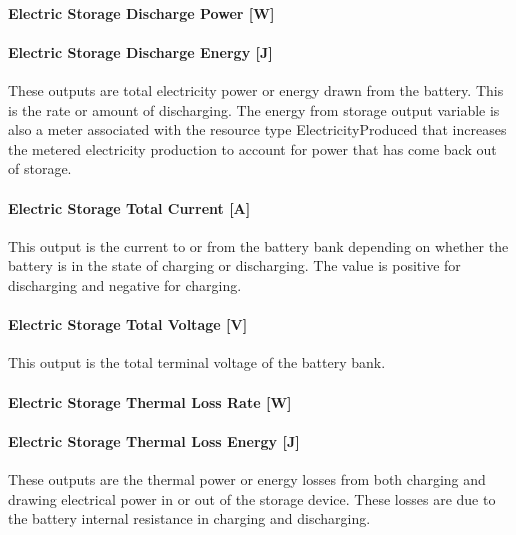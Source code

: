 \paragraph{Electric Storage Discharge Power {[}W{]}}\label{electric-storage-discharge-power-w-1}

\paragraph{Electric Storage Discharge Energy {[}J{]}}\label{electric-storage-discharge-energy-j-1}

These outputs are total electricity power or energy drawn from the battery. This is the rate or amount of discharging. The energy from storage output variable is also a meter associated with the resource type ElectricityProduced that increases the metered electricity production to account for power that has come back out of storage.

\paragraph{Electric Storage Total Current {[}A{]}}\label{electric-storage-total-current-a}

This output is the current to or from the battery bank depending on whether the battery is in the state of charging or discharging. The value is positive for discharging and negative for charging.

\paragraph{Electric Storage Total Voltage {[}V{]}}\label{electric-storage-total-voltage-v}

This output is the total terminal voltage of the battery bank.

\paragraph{Electric Storage Thermal Loss Rate {[}W{]}}\label{electric-storage-thermal-loss-rate-w-1}

\paragraph{Electric Storage Thermal Loss Energy {[}J{]}}\label{electric-storage-thermal-loss-energy-j-1}

These outputs are the thermal power or energy losses from both charging and drawing electrical power in or out of the storage device. These losses are due to the battery internal resistance in charging and discharging.

